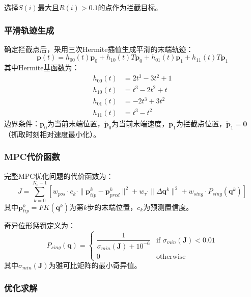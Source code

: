 \documentclass[12pt,a4paper]{ctexart}
\begin{document}
选择$S(i)$最大且$R(i) > 0.1$的点作为拦截目标。

\subsubsection{平滑轨迹生成}

确定拦截点后，采用三次Hermite插值生成平滑的末端轨迹：
\begin{equation}
  \mathbf{p}(t) = h_{00}(t)\mathbf{p}_0 + h_{10}(t)T\dot{\mathbf{p}}_0 + h_{01}(t)\mathbf{p}_1 + h_{11}(t)T\dot{\mathbf{p}}_1
\end{equation}
其中Hermite基函数为：
\begin{align}
  h_{00}(t) &= 2t^3 - 3t^2 + 1 \\
  h_{10}(t) &= t^3 - 2t^2 + t \\
  h_{01}(t) &= -2t^3 + 3t^2 \\
  h_{11}(t) &= t^3 - t^2
\end{align}
边界条件：$\mathbf{p}_0$为当前末端位置，$\dot{\mathbf{p}}_0$为当前末端速度，$\mathbf{p}_1$为拦截点位置，$\dot{\mathbf{p}}_1 = \mathbf{0}$（抓取时刻相对速度最小化）。

\subsubsection{MPC代价函数}

完整MPC优化问题的代价函数为：
\begin{equation}
  J = \sum_{k=0}^{N_c-1} \left[ w_{pos} \cdot c_k \cdot \|\mathbf{p}_{tip}^k - \mathbf{p}_{pred}^k\|^2 + w_{\tau} \cdot \|\Delta\mathbf{q}^k\|^2 + w_{sing} \cdot P_{sing}(\mathbf{q}^k) \right]
\end{equation}
其中$\mathbf{p}_{tip}^k = FK(\mathbf{q}^k)$为第$k$步的末端位置，$c_k$为预测置信度。

奇异位形惩罚定义为：
\begin{equation}
  P_{sing}(\mathbf{q}) = \begin{cases} \dfrac{1}{\sigma_{min}(\mathbf{J}) + 10^{-6}} & \text{if } \sigma_{min}(\mathbf{J}) < 0.01 \\[6pt] 0 & \text{otherwise} \end{cases}
\end{equation}
其中$\sigma_{min}(\mathbf{J})$为雅可比矩阵的最小奇异值。

\subsubsection{优化求解}
\end{document}
